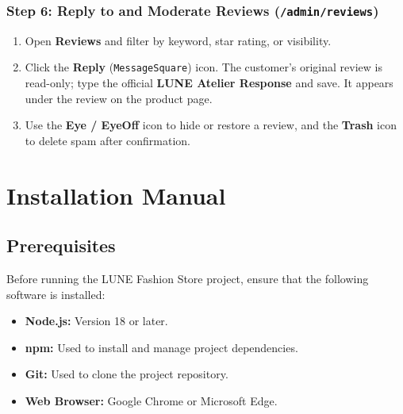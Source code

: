 \documentclass[12pt,a4paper,oneside]{report}
\begin{document}
\subsubsection{Step 6: Reply to and Moderate Reviews (\texttt{/admin/reviews})}
\begin{enumerate}[leftmargin=1.2cm]
    \item Open \textbf{Reviews} and filter by keyword, star rating, or visibility.
    \item Click the \textbf{Reply} (\texttt{MessageSquare}) icon. The customer's original review is read-only; type the official \textbf{LUNE Atelier Response} and save. It appears under the review on the product page.
    \item Use the \textbf{Eye / EyeOff} icon to hide or restore a review, and the \textbf{Trash} icon to delete spam after confirmation.
\end{enumerate}

\section{Installation Manual}

\subsection{Prerequisites}
Before running the LUNE Fashion Store project, ensure that the following software is installed:
\begin{itemize}[leftmargin=1.2cm]
    \item \textbf{Node.js:} Version 18 or later.
    \item \textbf{npm:} Used to install and manage project dependencies.
    \item \textbf{Git:} Used to clone the project repository.
    \item \textbf{Web Browser:} Google Chrome or Microsoft Edge.
\end{itemize}
\end{document}
